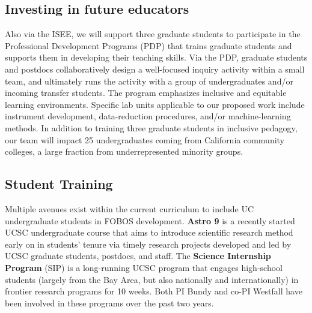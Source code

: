 \documentclass[oneside,11pt]{amsart}
\begin{document}
\subsection{Investing in future educators} Also via the ISEE, we will
support three graduate students to participate in the Professional
Development Programs (PDP) that trains graduate students and supports
them in developing their teaching skills.  Via the PDP, graduate
students and postdocs collaboratively design a well-focused inquiry
activity within a small team, and ultimately runs the activity with a
group of undergraduates and/or incoming transfer students.  The program
emphasizes inclusive and equitable learning environments.  Specific lab
units applicable to our proposed work include instrument development,
data-reduction procedures, and/or machine-learning methods.  In addition
to training three graduate students in inclusive pedagogy, our team will
impact 25 undergraduates coming from California community colleges, a
large fraction from underrepresented minority groups.


\subsection{Student Training} Multiple avenues exist within the current
curriculum to include UC undergraduate students in FOBOS development.
{\bf Astro 9} is a recently started UCSC undergraduate course that aims
to introduce scientific research method early on in students' tenure via
timely research projects developed and led by UCSC graduate students,
postdocs, and staff.  The {\bf Science Internship Program} (SIP) is a
long-running UCSC program that engages high-school students (largely
from the Bay Area, but also nationally and internationally) in frontier
research programs for 10 weeks.  Both PI Bundy and co-PI Westfall have
been involved in these programs over the past two years.
\end{document}
